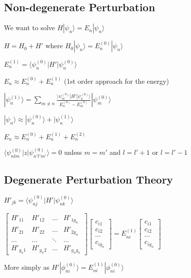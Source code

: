 \documentclass[12pt]{article}
\begin{document}
\begin{spacing}{2.0}
\subsection{Non-degenerate Perturbation}

We want to solve $H|\psi_n \rangle= E_n|\psi_n \rangle$

$H=H_0+H'$ where $H_0|\psi_n \rangle= E_n^{(0)}|\psi_n \rangle$

$E_n^{(1)}= \langle \psi_n^{(0)}|H'|\psi_n^{(0)} \rangle$

$E_n\approx E_n^{(0)} + E_n^{(1)}$ (1st order approach for the energy)

$| \psi_n^{(1)} \rangle = \sum_{m\ne n} \frac{\rangle \psi_m^{(9)}|H'| \psi_n^{(0)} \rangle}{E_n^{(0)}- E_m^{(0)}} |\psi_m^{(0)} \rangle$

$|\psi_n\rangle \approx |\psi_n^{(0)}\rangle + |\psi_n^{(1)}\rangle$

$E_n \approx E_n^{(0)} + E_n^{(1)} + E_n^{(2)}$

$\langle \psi_{nlm}^{(0)}|z|\psi_{n'l'm'}^{(0)} \rangle =0$ unless $m=m'$ and $l=l'+1$ or $l=l'-1$

\subsection{Degenerate Perturbation Theory}

$H'_{jk}= \langle \psi_{nj}^{(0)} |H'| \psi_{nk}^{(0)} \rangle$

$\left[
\begin{array}{cccc}
H'_{11} & H'_{12} & \ldots &H'_{1g_{n}} \\
H'_{21} & H'_{22} & \ldots &H'_{2g_{n}} \\
\ldots & \ldots & \ddots & \ldots\\
H'_{g_n1} & H'_{g_n2} & \ldots &H'_{g_n g_{n}}
\end{array}
\right] 
\left[
\begin{array}{c}
c_{i1} \\
c_{i2} \\
\cdots \\
c_{ig_n}
\end{array}
\right]
=
E_{ni}^{(1)}
\left[
\begin{array}{c}
c_{i1} \\
c_{i2} \\
\cdots \\
c_{ig_n}
\end{array}
\right]
$

More simply as $H'|\phi_{ni}^{(0)}\rangle = E_{ni}^{(1)} |\phi_{ni}^{(0)} \rangle$


\end{spacing}
\end{document}
